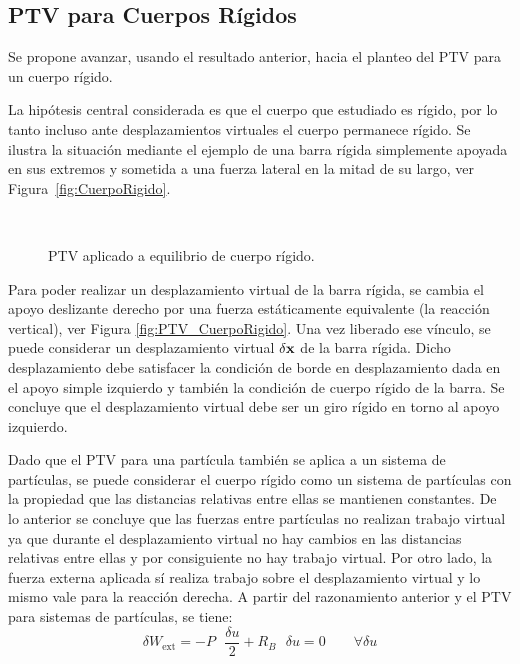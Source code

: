 





\subsection{PTV para Cuerpos Rígidos}

Se propone avanzar, usando el resultado anterior, hacia el planteo del PTV para un cuerpo rígido.

La hipótesis central considerada es que el cuerpo que estudiado es rígido, por lo tanto incluso ante desplazamientos virtuales el cuerpo permanece rígido. %
%
Se ilustra la situación mediante el ejemplo de una barra rígida simplemente apoyada en sus extremos y sometida a una fuerza lateral en la mitad de su largo, ver Figura~\ref{fig:CuerpoRigido}.
%
\begin{figure}[htb]
	\centering
	\\
	\caption{PTV aplicado a equilibrio de cuerpo rígido.}
\end{figure}
%
Para poder realizar un desplazamiento virtual de la barra rígida, se cambia el apoyo deslizante derecho por una fuerza estáticamente equivalente (la reacción vertical), ver Figura \ref{fig:PTV_CuerpoRigido}. %
%
Una vez liberado ese vínculo, se puede considerar un desplazamiento virtual $\delta {\bf x}$ de la barra rígida. %
%
Dicho desplazamiento debe satisfacer la condición de borde en desplazamiento dada en el apoyo simple izquierdo y también la condición de cuerpo rígido de la barra. %
%
Se concluye que el desplazamiento virtual debe ser un giro rígido en torno al apoyo izquierdo.

Dado que el PTV para una partícula también se aplica a un sistema de partículas, se puede considerar el cuerpo rígido como un sistema de partículas con la propiedad que las distancias relativas entre ellas se mantienen constantes. %
%
De lo anterior se concluye que las fuerzas entre partículas no realizan trabajo virtual ya que durante el desplazamiento virtual no hay cambios en las distancias relativas entre ellas y por consiguiente no hay trabajo virtual. %
%
Por otro lado, la fuerza externa aplicada sí realiza trabajo sobre el desplazamiento virtual y lo mismo vale para la reacción derecha. A partir del razonamiento anterior y el PTV para sistemas de partículas, se tiene:
%
\begin{equation}
\delta W_{\text{ext}} = -P \text{ } \frac{\delta u}{2} + R_B \text{ } \delta u = 0 \qquad \forall \delta u
\end{equation}

